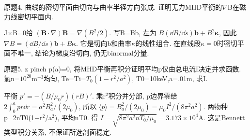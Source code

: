\begin{exercise}\label{ex:03-6-4}
原题4. 曲线的密切平面由切向与曲率半径方向张成. 证明无力MHD平衡的\ensuremath{\nabla}B在磁力线密切平面内.
\end{exercise}
\begin{solution}
J\ensuremath{\times}B=0给 $(\mathbf B\cdot\nabla)\mathbf B=\nabla(B^2/2)$. 写B=Bb, 左为 $B(\dd B/\dd s)\mathbf b+B^2\boldsymbol\kappa$, 因此 $\nabla B=(\dd B/\dd s)\mathbf b+B\boldsymbol\kappa$. 它是切向b和曲率\ensuremath{\kappa}的线性组合. 在直线段$\kappa=0$时密切平面不唯一, 结论为梯度沿切向, 仍无binormal分量.
\end{solution}
\begin{exercise}\label{ex:03-6-5}
原题5. z pinch p(a)=0, 将MHD平衡再积分证明平均p仅由总电流I决定并求函数. 氢n=$10^{20}$m$^{-3}$均匀, Te=Ti=$T_0(1-r^2/a^2)$, T0=10keV,a=.01m, 求I.
\end{exercise}
\begin{solution}
平衡 $p'=-(B/\mu_0r)(rB)'$. 乘r\ensuremath{{}^{2}}积分并分部, p边界零给 $2\int_0^apr\dd r=a^2B_a^2/(2\mu_0)$, 所以 $\langle p\rangle=B_a^2/(2\mu_0)=\mu_0I^2/(8\pi^2a^2)$. 两物种p=2nT0(1\ensuremath{-}r\ensuremath{{}^{2}}/a\ensuremath{{}^{2}}), 平均nT0. 得 $I=\sqrt{8\pi^2a^2nT_0/\mu_0}=3.173\times10^4$A. 这是Bennett类型积分关系, 不保证所选剖面稳定.
\end{solution}
